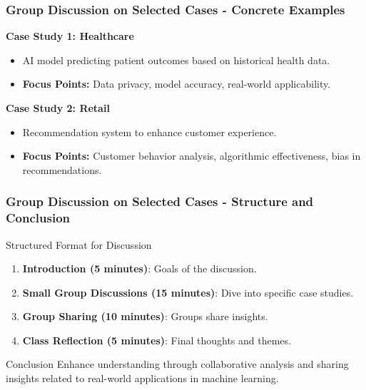 \documentclass[aspectratio=169]{beamer}
\begin{document}
\begin{frame}[fragile]
    \frametitle{Group Discussion on Selected Cases - Concrete Examples}
    \textbf{Case Study 1: Healthcare}
    \begin{itemize}
        \item AI model predicting patient outcomes based on historical health data.
        \item \textbf{Focus Points:} Data privacy, model accuracy, real-world applicability.
    \end{itemize}
    
    \vspace{0.5cm}
    
    \textbf{Case Study 2: Retail}
    \begin{itemize}
        \item Recommendation system to enhance customer experience.
        \item \textbf{Focus Points:} Customer behavior analysis, algorithmic effectiveness, bias in recommendations.
    \end{itemize}
\end{frame}

\begin{frame}[fragile]
    \frametitle{Group Discussion on Selected Cases - Structure and Conclusion}
    \begin{block}{Structured Format for Discussion}
        \begin{enumerate}
            \item \textbf{Introduction (5 minutes)}: Goals of the discussion.
            \item \textbf{Small Group Discussions (15 minutes)}: Dive into specific case studies.
            \item \textbf{Group Sharing (10 minutes)}: Groups share insights.
            \item \textbf{Class Reflection (5 minutes)}: Final thoughts and themes.
        \end{enumerate}
    \end{block}

    \begin{block}{Conclusion}
        Enhance understanding through collaborative analysis and sharing insights related to real-world applications in machine learning.
    \end{block}
\end{frame}
\end{document}

